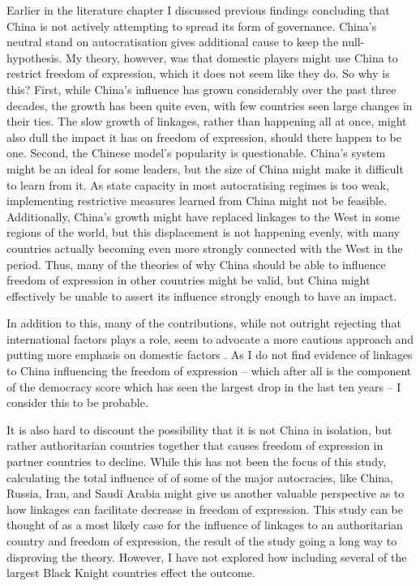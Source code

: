 Earlier in the literature chapter I discussed previous findings concluding that China is not actively attempting to spread its form of governance. China's neutral stand on autocratisation gives additional cause to keep the null-hypothesis. My theory, however, was that domestic players might use China to restrict freedom of expression, which it does not seem like they do. So why is this? First, while China's influence has grown considerably over the past three decades, the growth has been quite even, with few countries seen large changes in their ties. The slow growth of linkages, rather than happening all at once, might also dull the impact it has on freedom of expression, should there happen to be one. Second, the Chinese model's popularity is questionable. China's system might be an ideal for some leaders, but the size of China might make it difficult to learn from it. As state capacity in most autocratising regimes is too weak, implementing restrictive measures learned from China might not be feasible. Additionally, China's growth might have replaced linkages to the West in some regions of the world, but this displacement is not happening evenly, with many countries actually becoming even more strongly connected with the West in the period. Thus, many of the theories of why China should be able to influence freedom of expression in other countries might be valid, but China might effectively be unable to assert its influence strongly enough to have an impact.

In addition to this, many of the contributions, while not outright rejecting that international factors plays a role, seem to advocate a more cautious approach and putting more emphasis on domestic factors \citep{bader_china_2015, buzogany_illiberal_2017, borzel_noble_2015, risse_democracy_2015}. As I do not find evidence of linkages to China influencing the freedom of expression -- which after all is the component of the democracy score which has seen the largest drop in the last ten years -- I consider this to be probable. 

It is also hard to discount the possibility that it is not China in isolation, but rather authoritarian countries together that causes freedom of expression in partner countries to decline. While this has not been the focus of this study, calculating the total influence of of some of the major autocracies, like China, Russia, Iran, and Saudi Arabia might give us another valuable perspective as to how linkages can facilitate decrease in freedom of expression. This study can be thought of as a most likely case for the influence of linkages to an authoritarian country and freedom of expression, the result of the study going a long way to disproving the theory. However, I have not explored how including several of the largest Black Knight countries effect the outcome. 

